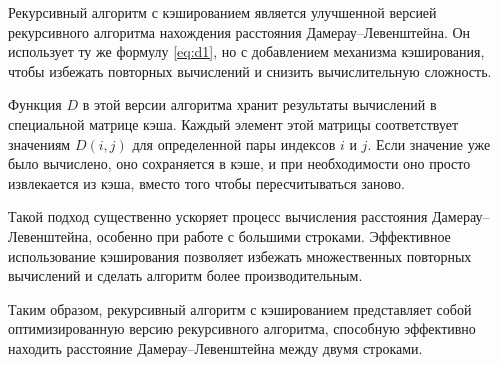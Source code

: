 Рекурсивный алгоритм с кэшированием является улучшенной версией рекурсивного алгоритма нахождения расстояния Дамерау--Левенштейна. 
Он использует ту же формулу \ref{eq:d1}, но с добавлением механизма кэширования, чтобы избежать повторных вычислений и снизить вычислительную сложность.

Функция $D$ в этой версии алгоритма хранит результаты вычислений в специальной матрице кэша. 
Каждый элемент этой матрицы соответствует значениям $D(i, j)$ для определенной пары индексов $i$ и $j$. 
Если значение уже было вычислено, оно сохраняется в кэше, и при необходимости оно просто извлекается из кэша, вместо того чтобы пересчитываться заново.

Такой подход существенно ускоряет процесс вычисления расстояния Дамерау--Левенштейна, особенно при работе с большими строками.
Эффективное использование кэширования позволяет избежать множественных повторных вычислений и сделать алгоритм более производительным.

Таким образом, рекурсивный алгоритм с кэшированием представляет собой оптимизированную версию рекурсивного алгоритма, способную эффективно находить расстояние Дамерау--Левенштейна между двумя строками.
